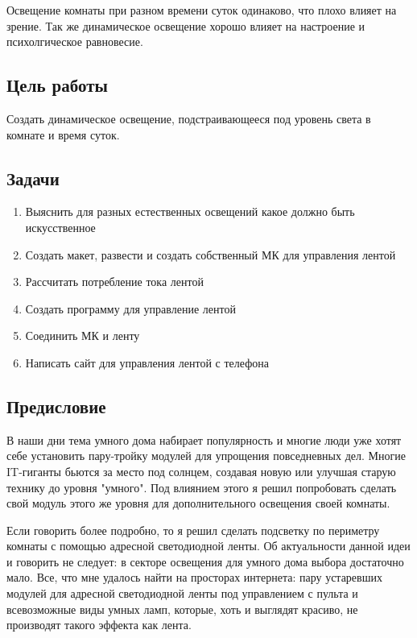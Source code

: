 \documentclass[a4paper, 12pt]{article}
\begin{document}
Освещение комнаты при разном времени суток одинаково, что плохо влияет на 
зрение. Так же динамическое освещение хорошо влияет на настроение и 
психолгическое равновесие.

\subsection{Цель работы}

Создать динамическое освещение, подстраивающееся под уровень света в комнате и 
время суток.

\subsection{Задачи}
\begin{enumerate}
  \item Выяснить для разных естественных освещений какое должно быть искусственное
  \item Создать макет, развести и создать собственный МК для управления лентой
  \item Рассчитать потребление тока лентой 
  \item Создать программу для управление лентой
  \item Соединить МК и ленту
  \item Написать сайт для управления лентой с телефона 
\end{enumerate}

\newpage

\subsection{Предисловие}

В наши дни тема умного дома набирает популярность и многие люди уже хотят себе
установить пару-тройку модулей для упрощения повседневных дел. Многие 
IT-гиганты бьются за место под солнцем, создавая новую или улучшая старую 
технику до уровня "умного". Под влиянием этого я решил попробовать сделать 
свой модуль этого же уровня для дополнительного освещения своей комнаты.

Если говорить более подробно, то я решил сделать подсветку по периметру комнаты 
с помощью адресной светодиодной ленты. Об актуальности данной идеи и говорить 
не следует: в секторе освещения для умного дома выбора достаточно мало. Все, 
что мне удалось найти на просторах интернета: пару устаревших модулей для 
адресной светодиодной ленты под управлением с пульта и всевозможные виды умных
ламп, которые, хоть и выглядят красиво, не производят такого эффекта как 
лента. 
\end{document}
